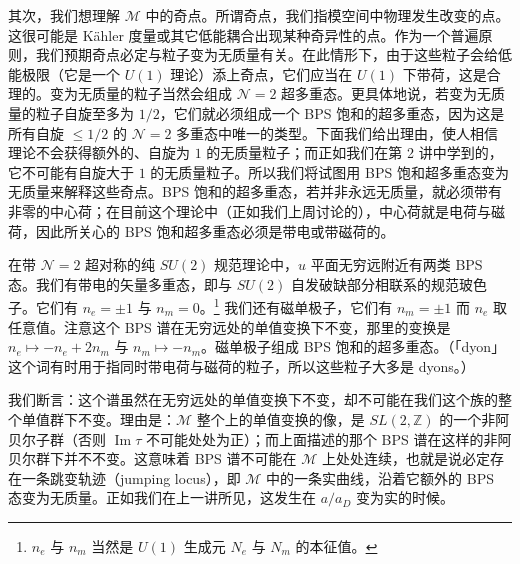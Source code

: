 其次，我们想理解 $\mathcal{M}$ 中的奇点。所谓奇点，我们指模空间中物理发生改变的点。这很可能是 Kähler 度量或其它低能耦合出现某种奇异性的点。作为一个普遍原则，我们预期奇点必定与粒子变为无质量有关。在此情形下，由于这些粒子会给低能极限（它是一个 $U(1)$ 理论）添上奇点，它们应当在 $U(1)$ 下带荷，这是合理的。变为无质量的粒子当然会组成 $\mathcal{N}=2$ 超多重态。更具体地说，若变为无质量的粒子自旋至多为 $1/2$，它们就必须组成一个 BPS 饱和的超多重态，因为这是所有自旋 $\le1/2$ 的 $\mathcal{N}=2$ 多重态中唯一的类型。下面我们给出理由，使人相信理论不会获得额外的、自旋为 $1$ 的无质量粒子；而正如我们在第 2 讲中学到的，它不可能有自旋大于 $1$ 的无质量粒子。所以我们将试图用 BPS 饱和超多重态变为无质量来解释这些奇点。BPS 饱和的超多重态，若并非永远无质量，就必须带有非零的中心荷；在目前这个理论中（正如我们上周讨论的），中心荷就是电荷与磁荷，因此所关心的 BPS 饱和超多重态必须是带电或带磁荷的。

在带 $\mathcal{N}=2$ 超对称的纯 $SU(2)$ 规范理论中，$u$ 平面无穷远附近有两类 BPS 态。我们有带电的矢量多重态，即与 $SU(2)$ 自发破缺部分相联系的规范玻色子。它们有 $n_e=\pm1$ 与 $n_m=0$。\footnote{$n_e$ 与 $n_m$ 当然是 $U(1)$ 生成元 $N_e$ 与 $N_m$ 的本征值。} 我们还有磁单极子，它们有 $n_m=\pm1$ 而 $n_e$ 取任意值。注意这个 BPS 谱在无穷远处的单值变换下不变，那里的变换是 $n_e\mapsto-n_e+2n_m$ 与 $n_m\mapsto-n_m$。磁单极子组成 BPS 饱和的超多重态。（「dyon」这个词有时用于指同时带电荷与磁荷的粒子，所以这些粒子大多是 dyons。）

我们断言：这个谱虽然在无穷远处的单值变换下不变，却不可能在我们这个族的整个单值群下不变。理由是：$\mathcal{M}$ 整个上的单值变换的像，是 $SL(2,\mathbb{Z})$ 的一个非阿贝尔子群（否则 $\operatorname{Im}\tau$ 不可能处处为正）；而上面描述的那个 BPS 谱在这样的非阿贝尔群下并不不变。这意味着 BPS 谱不可能在 $\mathcal{M}$ 上处处连续，也就是说必定存在一条跳变轨迹（jumping locus），即 $\mathcal{M}$ 中的一条实曲线，沿着它额外的 BPS 态变为无质量。正如我们在上一讲所见，这发生在 $a/a_D$ 变为实的时候。



